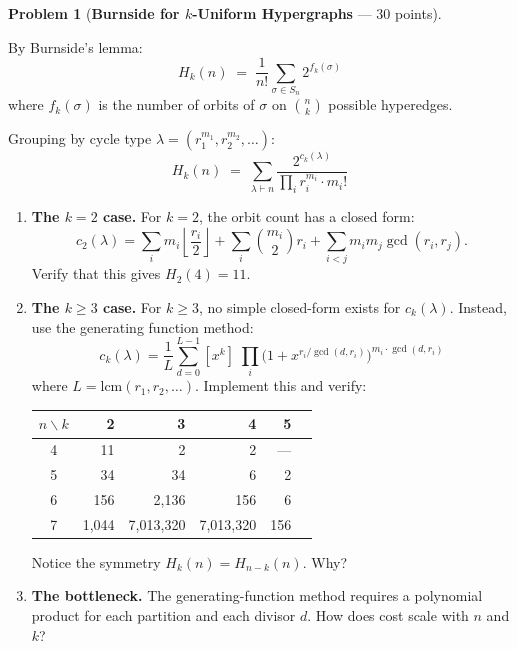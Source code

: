 \documentclass[11pt,letterpaper]{article}
\theoremstyle{definition}
\newtheorem{problem}{Problem}
\theoremstyle{remark}
\begin{document}
\begin{problem}[\textbf{Burnside for $k$-Uniform Hypergraphs} --- 30 points]\label{prob:burnside}

By Burnside's lemma:
\[
H_k(n) \;=\; \frac{1}{n!} \sum_{\sigma \in S_n} 2^{f_k(\sigma)}
\]
where $f_k(\sigma)$ is the number of orbits of $\sigma$ on $\binom{n}{k}$ possible hyperedges.

Grouping by cycle type $\lambda = (r_1^{m_1}, r_2^{m_2}, \ldots)$:
\[
H_k(n) \;=\; \sum_{\lambda \vdash n} \frac{2^{c_k(\lambda)}}{\prod_i r_i^{m_i} \cdot m_i!}
\]

\begin{enumerate}[label=(\alph*)]
  \item \textbf{The $k = 2$ case.} For $k = 2$, the orbit count has a closed form:
  \[
  c_2(\lambda) = \sum_i m_i \left\lfloor \frac{r_i}{2} \right\rfloor + \sum_i \binom{m_i}{2} r_i + \sum_{i < j} m_i m_j \gcd(r_i, r_j).
  \]
  Verify that this gives $H_2(4) = 11$.

  \item \textbf{The $k \geq 3$ case.} For $k \geq 3$, no simple closed-form exists for $c_k(\lambda)$. Instead, use the generating function method:
  \[
  c_k(\lambda) = \frac{1}{L} \sum_{d=0}^{L-1} [x^k]\; \prod_i \bigl(1 + x^{r_i / \gcd(d, r_i)}\bigr)^{m_i \cdot \gcd(d, r_i)}
  \]
  where $L = \mathrm{lcm}(r_1, r_2, \ldots)$. Implement this and verify:

  \begin{center}
  \begin{tabular}{c|rrrrr}
  \toprule
  $n \backslash k$ & 2 & 3 & 4 & 5 \\
  \midrule
  4 & 11 & 2 & 2 & --- \\
  5 & 34 & 34 & 6 & 2 \\
  6 & 156 & 2{,}136 & 156 & 6 \\
  7 & 1{,}044 & 7{,}013{,}320 & 7{,}013{,}320 & 156 \\
  \bottomrule
  \end{tabular}
  \end{center}

  Notice the symmetry $H_k(n) = H_{n-k}(n)$. Why?

  \item \textbf{The bottleneck.} The generating-function method requires a polynomial product for each partition and each divisor $d$. How does cost scale with $n$ and $k$?
\end{enumerate}
\end{problem}
\end{document}
